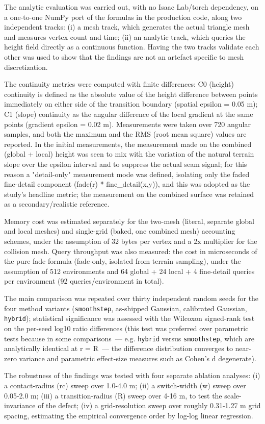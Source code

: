 The analytic evaluation was carried out, with no Isaac Lab/torch dependency, on a one-to-one NumPy port of the formulas in the production code, along two independent tracks: (i) a mesh track, which generates the actual triangle mesh and measures vertex count and time; (ii) an analytic track, which queries the height field directly as a continuous function. Having the two tracks validate each other was used to show that the findings are not an artefact specific to mesh discretization.

The continuity metrics were computed with finite differences: C0 (height) continuity is defined as the absolute value of the height difference between points immediately on either side of the transition boundary (spatial epsilon = 0.05 m); C1 (slope) continuity as the angular difference of the local gradient at the same points (gradient epsilon = 0.02 m). Measurements were taken over 720 angular samples, and both the maximum and the RMS (root mean square) values are reported. In the initial measurements, the measurement made on the combined (global + local) height was seen to mix with the variation of the natural terrain slope over the epsilon interval and to suppress the actual seam signal; for this reason a "detail-only" measurement mode was defined, isolating only the faded fine-detail component (fade(r) * fine\_detail(x,y)), and this was adopted as the study's headline metric; the measurement on the combined surface was retained as a secondary/realistic reference.

Memory cost was estimated separately for the two-mesh (literal, separate global and local meshes) and single-grid (baked, one combined mesh) accounting schemes, under the assumption of 32 bytes per vertex and a 2x multiplier for the collision mesh. Query throughput was also measured: the cost in microseconds of the pure fade formula (fade-only, isolated from terrain sampling), under the assumption of 512 environments and 64 global + 24 local + 4 fine-detail queries per environment (92 queries/environment in total).

The main comparison was repeated over thirty independent random seeds for the four method variants (\texttt{smoothstep}, as-shipped Gaussian, calibrated Gaussian, \texttt{hybrid}); statistical significance was assessed with the Wilcoxon signed-rank test on the per-seed log10 ratio differences (this test was preferred over parametric tests because in some comparisons~--- e.g. \texttt{hybrid} versus \texttt{smoothstep}, which are analytically identical at r = R~--- the difference distribution converges to near-zero variance and parametric effect-size measures such as Cohen's d degenerate).

The robustness of the findings was tested with four separate ablation analyses: (i) a contact-radius (rc) sweep over 1.0-4.0 m; (ii) a switch-width (w) sweep over 0.05-2.0 m; (iii) a transition-radius (R) sweep over 4-16 m, to test the scale-invariance of the defect; (iv) a grid-resolution sweep over roughly 0.31-1.27 m grid spacing, estimating the empirical convergence order by log-log linear regression.
